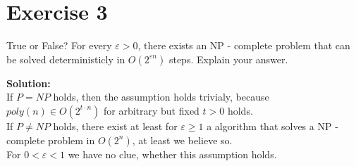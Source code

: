 \section*{Exercise 3}

True or False? For every $\varepsilon > 0$, there exists an NP - complete problem that can be solved deterministicly in
$O(2^{\varepsilon n})$ steps. Explain your answer.

\textbf{Solution:}\\
If $P=NP$ holds, then the assumption holds trivialy, because  $poly(n) \in O(2^{t \cdot n})$ for arbitrary but fixed $t > 0$ holds.\\

If $P \not= NP$ holds, there exist at least for $\varepsilon \geq 1$ a algorithm that solves a NP - complete problem in $O(2^n)$, at least
we believe so.\\

For $0 < \varepsilon < 1$ we have no clue, whether this assumption holds.

